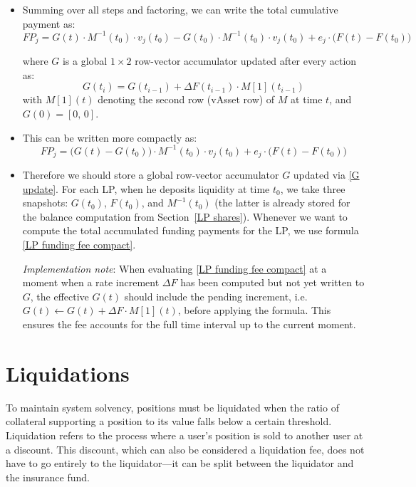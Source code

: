 \documentclass{article}
\begin{document}
\begin{itemize}
\item Summing over all steps and factoring, we can write the total cumulative payment as:
\begin{equation}\label{LP funding fee}
FP_j = G(t) \cdot M^{-1}(t_0) \cdot v_j(t_0) - G(t_0) \cdot M^{-1}(t_0) \cdot v_j(t_0)
       + e_j \cdot \bigl(F(t) - F(t_0)\bigr)
\end{equation}

where $G$ is a global $1 \times 2$ row-vector accumulator updated after every action as:
\begin{equation}\label{G update}
G(t_i) = G(t_{i-1}) + \Delta F(t_{i-1}) \cdot M[1](t_{i-1})
\end{equation}
with $M[1](t)$ denoting the second row (vAsset row) of $M$ at time $t$, and
$G(0) = [0,\, 0]$.

\item This can be written more compactly as:
\begin{equation}\label{LP funding fee compact}
FP_j = \bigl(G(t) - G(t_0)\bigr) \cdot M^{-1}(t_0) \cdot v_j(t_0)
       + e_j \cdot \bigl(F(t) - F(t_0)\bigr)
\end{equation}

\item Therefore we should store a global row-vector accumulator $G$ updated via
      \eqref{G update}. For each LP, when he deposits liquidity at time $t_0$, we take
      three snapshots: $G(t_0)$, $F(t_0)$, and $M^{-1}(t_0)$ (the latter is already
      stored for the balance computation from Section~\ref{LP shares}). Whenever we want
      to compute the total accumulated funding payments for the LP, we use formula
      \eqref{LP funding fee compact}.

\noindent\textit{Implementation note}: When evaluating \eqref{LP funding fee compact} at a
moment when a rate increment $\Delta F$ has been computed but not yet written to $G$, the
effective $G(t)$ should include the pending increment, i.e.\ $G(t) \leftarrow G(t) + \Delta F
\cdot M[1](t)$, before applying the formula. This ensures the fee accounts for the full
time interval up to the current moment.

\end{itemize}


\section{Liquidations}\label{liquidations}

To maintain system solvency, positions must be liquidated when the ratio of collateral supporting a position to its value falls below a certain threshold. Liquidation refers to the process where a user’s position is sold to another user at a discount. This discount, which can also be considered a liquidation fee, does not have to go entirely to the liquidator—it can be split between the liquidator and the insurance fund.
\end{document}
